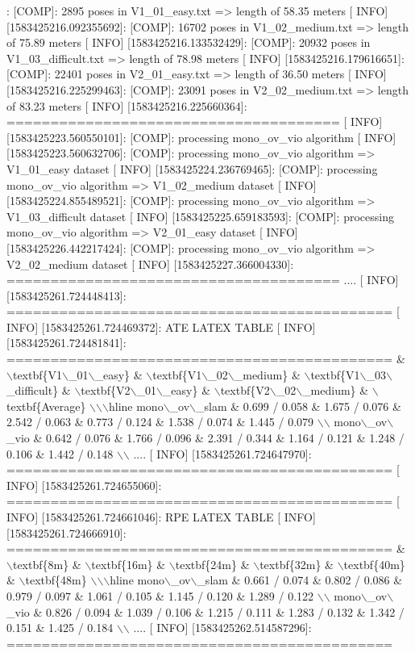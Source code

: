 \begin{DoxyCode}
[ INFO] [1583425216.054023187]: [COMP]: 2895 poses in V1\_01\_easy.txt => length of 58.35 meters
[ INFO] [1583425216.092355692]: [COMP]: 16702 poses in V1\_02\_medium.txt => length of 75.89 meters
[ INFO] [1583425216.133532429]: [COMP]: 20932 poses in V1\_03\_difficult.txt => length of 78.98 meters
[ INFO] [1583425216.179616651]: [COMP]: 22401 poses in V2\_01\_easy.txt => length of 36.50 meters
[ INFO] [1583425216.225299463]: [COMP]: 23091 poses in V2\_02\_medium.txt => length of 83.23 meters
[ INFO] [1583425216.225660364]: ======================================
[ INFO] [1583425223.560550101]: [COMP]: processing mono\_ov\_vio algorithm
[ INFO] [1583425223.560632706]: [COMP]: processing mono\_ov\_vio algorithm => V1\_01\_easy dataset
[ INFO] [1583425224.236769465]: [COMP]: processing mono\_ov\_vio algorithm => V1\_02\_medium dataset
[ INFO] [1583425224.855489521]: [COMP]: processing mono\_ov\_vio algorithm => V1\_03\_difficult dataset
[ INFO] [1583425225.659183593]: [COMP]: processing mono\_ov\_vio algorithm => V2\_01\_easy dataset
[ INFO] [1583425226.442217424]: [COMP]: processing mono\_ov\_vio algorithm => V2\_02\_medium dataset
[ INFO] [1583425227.366004330]: ======================================
....
[ INFO] [1583425261.724448413]: ============================================
[ INFO] [1583425261.724469372]: ATE LATEX TABLE
[ INFO] [1583425261.724481841]: ============================================
 & \(\backslash\)textbf\{V1\(\backslash\)\_01\(\backslash\)\_easy\} & \(\backslash\)textbf\{V1\(\backslash\)\_02\(\backslash\)\_medium\} & \(\backslash\)textbf\{V1\(\backslash\)\_03\(\backslash\)\_difficult\}
 & \(\backslash\)textbf\{V2\(\backslash\)\_01\(\backslash\)\_easy\} & \(\backslash\)textbf\{V2\(\backslash\)\_02\(\backslash\)\_medium\} & \(\backslash\)textbf\{Average\} \(\backslash\)\(\backslash\)\(\backslash\)hline
mono\(\backslash\)\_ov\(\backslash\)\_slam & 0.699 / 0.058 & 1.675 / 0.076 & 2.542 / 0.063 & 0.773 / 0.124 & 1.538 / 0.074 & 1.445 /
       0.079 \(\backslash\)\(\backslash\)
mono\(\backslash\)\_ov\(\backslash\)\_vio & 0.642 / 0.076 & 1.766 / 0.096 & 2.391 / 0.344 & 1.164 / 0.121 & 1.248 / 0.106 & 1.442 /
       0.148 \(\backslash\)\(\backslash\)
....
[ INFO] [1583425261.724647970]: ============================================
[ INFO] [1583425261.724655060]: ============================================
[ INFO] [1583425261.724661046]: RPE LATEX TABLE
[ INFO] [1583425261.724666910]: ============================================
 & \(\backslash\)textbf\{8m\} & \(\backslash\)textbf\{16m\} & \(\backslash\)textbf\{24m\} & \(\backslash\)textbf\{32m\} & \(\backslash\)textbf\{40m\} & \(\backslash\)textbf\{48m\} \(\backslash\)\(\backslash\)\(\backslash\)hline
mono\(\backslash\)\_ov\(\backslash\)\_slam & 0.661 / 0.074 & 0.802 / 0.086 & 0.979 / 0.097 & 1.061 / 0.105 & 1.145 / 0.120 & 1.289 /
       0.122 \(\backslash\)\(\backslash\)
mono\(\backslash\)\_ov\(\backslash\)\_vio & 0.826 / 0.094 & 1.039 / 0.106 & 1.215 / 0.111 & 1.283 / 0.132 & 1.342 / 0.151 & 1.425 /
       0.184 \(\backslash\)\(\backslash\)
....
[ INFO] [1583425262.514587296]: ============================================
\end{DoxyCode}


